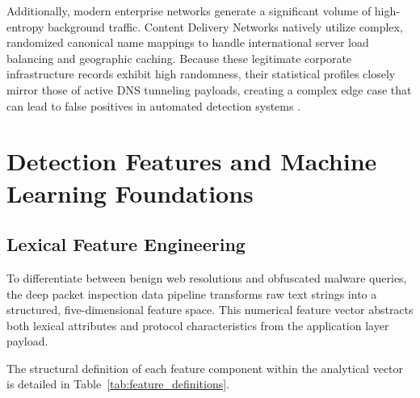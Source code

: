 \documentclass[14pt, a4paper, oneside]{report}
\begin{document}
Additionally, modern enterprise networks generate a significant volume of high-entropy background traffic. Content Delivery Networks natively utilize complex, randomized canonical name mappings to handle international server load balancing and geographic caching. Because these legitimate corporate infrastructure records exhibit high randomness, their statistical profiles closely mirror those of active DNS tunneling payloads, creating a complex edge case that can lead to false positives in automated detection systems \cite{isik2025,salat2023}.

\section{Detection Features and Machine Learning Foundations}
\label{sec:detection_features}

\subsection{Lexical Feature Engineering}
To differentiate between benign web resolutions and obfuscated malware queries, the deep packet inspection data pipeline transforms raw text strings into a structured, five-dimensional feature space. This numerical feature vector abstracts both lexical attributes and protocol characteristics from the application layer payload.


The structural definition of each feature component within the analytical vector is detailed in Table~\ref{tab:feature_definitions}.
\end{document}
